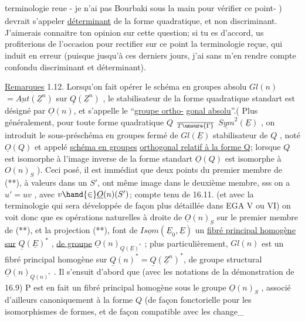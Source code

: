 
terminologie reu\textsubscript{\unsure{,}}e  - je n'ai pas Bourbaki sous la main pour vérifier ce
point- ) devrait s'appeler \uline{déterminant} de la forme quadratique, et non
discriminant. J'aimerais connaitre ton opinion sur cette question; si
tu es d'accord, us profiterions de l'occasion pour rectifier sur ce
point la terminologie reçue, qui induit en erreur (puisque jusqu'à ces
derniers jours, j'ai sans m'en rendre compte confondu discriminant et
déterminant).

\uline{Remarques} 1.12. Lorsqu'on fait opérer le schéma en groupes absolu
$Gl(n)$  $= \underline{Aut}(\underline{Z}^n )$ sur $\underline{Q}(\underline{Z}^n)$ , le stabilisateur de la forme
quadratique standart est désigné par $\underline{O}(n)$, et s'appelle le ``\uline{groupe ortho-}%
\uline{gonal absolu}''.( Plus généralement, pour toute forme quadratique $Q$ \hand{$\in$}
$\over{T}{\unsure{\Gamma}}$ $\underline{Sym}^2(\underline{E})$ , on introduit le sous-préschéma en groupes fermé de
$Gl(\underline{E})$  stabilisateur de $Q$ , noté $\underline{O}(Q)$ et appelé \uline{schéma en groupes}
\uline{orthogonal relatif à la forme Q}; lorsque $Q$ est isomorphe à l'image
inverse de la forme standart \hand{,} $\underline{O}(Q)$ est isomorphe à $O(n)_S$ ). Ceci posé,
il est immédiat que deux points  du premier membre de (**), à valeurs dans
un $S'$, ont même image dans le deuxième membre, sss 
 on a $u' = uv$ , avec $v \hand{\in} \underline{O}(n)(S')$; compte tenu de 16.11. (et
avec la terminologie qui sera développée de façon plus détaillée dans
EGA V ou VI) on voit donc que es opérations naturelles à droite de
$\underline{O}(n)_S$ sur le premier membre de (**), et la projection (**), font de
$\underline{Isom}(\underline{E}_0,\underline{E})$ un \uline{fibré principal homogène sur} $\underline{Q}(\underline{E})^*$ , \uline{de groupe} $\underline{O}(n)_{\underline{Q}(\underline{E})^*}$ ;
plus particulièrement,  $Gl(n)$ est un fibré principal
homogène sur $\underline{Q}(n)^* = \underline{Q}(\underline{Z}^n)^*$, de groupe structural $\underline{O}(n)_{\underline{Q}(n)^*}$ . Il
s'ensuit  d'abord que (avec les notations de la démonstration de 16.9)
P est en fait un fibré principal homogène sous le groupe $\underline{O}(n)_S$ , associé
 d'ailleurs canoniquement à la forme $Q$ (de façon fonctorielle
pour les isomorphismes de formes, et de façon compatible avec les change\_%


